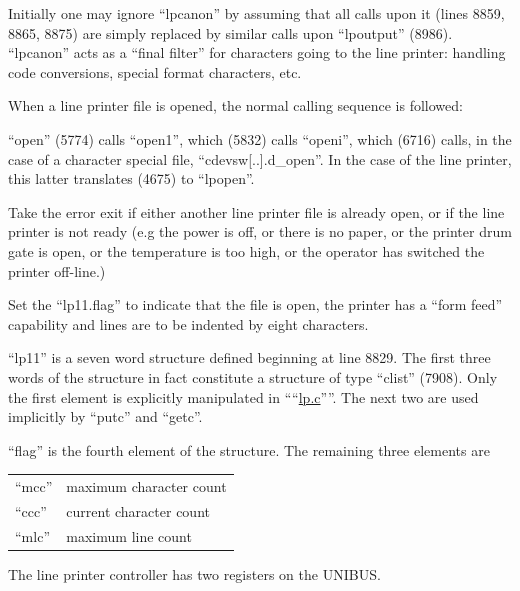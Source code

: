 Initially one may ignore ``lpcanon'' by
assuming that all calls upon it (lines
8859, 8865, 8875) are simply replaced
by similar calls upon ``lpoutput''
(8986). ``lpcanon'' acts as a ``final
filter'' for characters going to the
line printer: handling code conversions, special format characters, etc.


When a line printer file is opened, the
normal calling sequence is followed:

``open'' (5774) calls ``open1'',
which (5832) calls ``openi'', which
(6716) calls, in the case of a
character      special      file,
``cdevsw[..].d\_open''. In the case
of the line printer, this latter
translates (4675) to ``lpopen''.

\bd
\item[8853:] Take the error exit if either
another line printer file is
already open, or if the line
printer is not ready (e.g the
power is off, or there is no
paper, or the printer drum gate
is open, or the temperature is
too high, or the operator has
switched the printer off-line.)

\item[8857:] Set the ``lp11.flag'' to indicate
that the file is open, the
printer has a ``form feed'' capability and lines are to be
indented by eight characters.
\ed


\bd
\item[(a)] ``lp11'' is a seven word structure
defined beginning at line 8829. The
first three words of the structure in
fact constitute a structure of type
``clist'' (7908). Only the first element
is explicitly manipulated in ````\href{./v6/dmr/lp.c}{lp.c}''''.
The next two are used implicitly by
``putc'' and ``getc''.

\item[(b)] ``flag'' is the fourth element of
the structure. The remaining three elements are

\begin{tabular}{ll} \\
``mcc'' &      maximum character count\\
``ccc'' &     current character count\\
``mlc'' &     maximum line count\\
\end{tabular}

\bigskip

\item[(c)] The line printer controller has
two registers on the UNIBUS.
\ed

